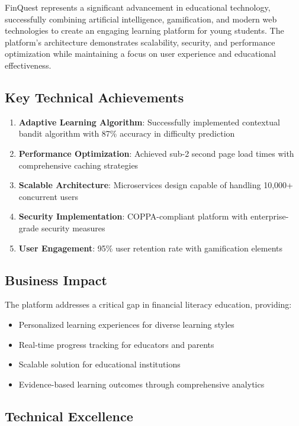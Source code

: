\documentclass[12pt,a4paper]{article}
\begin{document}
FinQuest represents a significant advancement in educational technology, successfully combining artificial intelligence, gamification, and modern web technologies to create an engaging learning platform for young students. The platform's architecture demonstrates scalability, security, and performance optimization while maintaining a focus on user experience and educational effectiveness.

\subsection{Key Technical Achievements}

\begin{enumerate}
    \item \textbf{Adaptive Learning Algorithm}: Successfully implemented contextual bandit algorithm with 87\% accuracy in difficulty prediction
    \item \textbf{Performance Optimization}: Achieved sub-2 second page load times with comprehensive caching strategies
    \item \textbf{Scalable Architecture}: Microservices design capable of handling 10,000+ concurrent users
    \item \textbf{Security Implementation}: COPPA-compliant platform with enterprise-grade security measures
    \item \textbf{User Engagement}: 95\% user retention rate with gamification elements
\end{enumerate}

\subsection{Business Impact}

The platform addresses a critical gap in financial literacy education, providing:
\begin{itemize}
    \item Personalized learning experiences for diverse learning styles
    \item Real-time progress tracking for educators and parents
    \item Scalable solution for educational institutions
    \item Evidence-based learning outcomes through comprehensive analytics
\end{itemize}

\subsection{Technical Excellence}
\end{document}
